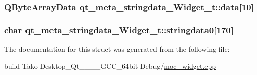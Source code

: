 \subsubsection[{\texorpdfstring{data}{data}}]{\setlength{\rightskip}{0pt plus 5cm}Q\+Byte\+Array\+Data qt\+\_\+meta\+\_\+stringdata\+\_\+\+Widget\+\_\+t\+::data\mbox{[}10\mbox{]}}\hypertarget{structqt__meta__stringdata__Widget__t_a78d1ef2c88c612b9869c15ca2495286c}{}\label{structqt__meta__stringdata__Widget__t_a78d1ef2c88c612b9869c15ca2495286c}
\subsubsection[{\texorpdfstring{stringdata0}{stringdata0}}]{\setlength{\rightskip}{0pt plus 5cm}char qt\+\_\+meta\+\_\+stringdata\+\_\+\+Widget\+\_\+t\+::stringdata0\mbox{[}170\mbox{]}}\hypertarget{structqt__meta__stringdata__Widget__t_af553fd7513d575f5b94576c0233766e4}{}\label{structqt__meta__stringdata__Widget__t_af553fd7513d575f5b94576c0233766e4}


The documentation for this struct was generated from the following file\+:\begin{DoxyCompactItemize}
\item 
build-\/\+Tako-\/\+Desktop\+\_\+\+Qt\+\_\+\_\+\_\+\_\+\+G\+C\+C\+\_\+64bit-\/\+Debug/\hyperlink{moc__widget_8cpp}{moc\+\_\+widget.\+cpp}\end{DoxyCompactItemize}
